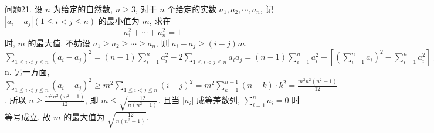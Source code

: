 问题21. 设 $n$ 为给定的自然数, $n \geqslant 3$, 对于 $n$ 个给定的实数 $a_1, a_2, \cdots, a_n$, 记
$\left|a_i-a_j\right|(1 \leqslant i<j \leqslant n)$ 的最小值为 $m$, 求在
$$
a_1^2+\cdots+a_n^2=1
$$
时, $m$ 的最大值.
不妨设 $a_1 \geqslant a_2 \geqslant \cdots \geqslant a_n$, 则 $a_i-a_j \geqslant(i-j) m$. $\sum_{1 \leqslant i<j \leqslant n}\left(a_i-a_j\right)^2= (n-1) \sum_{i=1}^n a_i^2-2 \sum_{1 \leqslant i<j \leqslant n} a_i a_j=(n-1) \sum_{i=1}^n a_i^2-\left[\left(\sum_{i=1}^n a_i\right)^2-\sum_{i=1}^n a_i^2\right] \leqslant n \sum_{i=1}^n a_i^2=$ n. 另一方面, $\sum_{1 \leqslant i<j \leqslant n}\left(a_i-a_j\right)^2 \geqslant m^2 \sum_{1 \leqslant i<j \leqslant n}(i-j)^2=m^2 \sum_{k=1}^{n-1}(n-k) \cdot k^2= \frac{m^2 n^2\left(n^2-1\right)}{12}$. 所以 $n \geqslant \frac{m^2 n^2\left(n^2-1\right)}{12}$, 即 $m \leqslant \sqrt{\frac{12}{n\left(n^2-1\right)}}$. 且当 $\left|a_i\right|$ 成等差数列, $\sum_{i=1}^n a_i=0$ 时等号成立.
故 $m$ 的最大值为 $\sqrt{\frac{12}{n\left(n^2-1\right)}}$.


